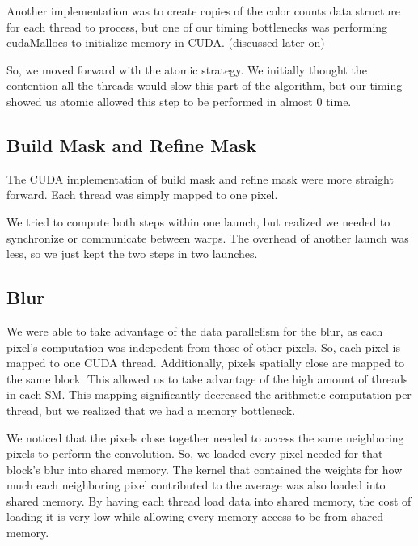 \documentclass[12pt]{article}
\begin{document}
Another implementation was to create copies of the color counts data structure
for each thread to process, but one of our timing bottlenecks was performing
cudaMallocs to initialize memory in CUDA. (discussed later on)

So, we moved forward with the atomic strategy. We initially thought the
contention all the threads would slow this part of the algorithm, but our
timing showed us atomic allowed this step to be performed in almost 0 time.

\subsection{Build Mask and Refine Mask}
The CUDA implementation of build mask and refine mask were more straight
forward. Each thread was simply mapped to one pixel.

We tried to compute both steps within one launch, but realized we needed to
synchronize or communicate between warps. The overhead of another launch was
less, so we just kept the two steps in two launches.

\subsection{Blur}
We were able to take advantage of the data parallelism for the blur, as each
pixel's computation was indepedent from those of other pixels. So, each pixel
is mapped to one CUDA thread. Additionally, pixels spatially close are mapped to
the same block. This allowed us to take advantage of the high
amount of threads in each SM. This mapping significantly decreased the
arithmetic computation per thread, but we realized that we had a memory
bottleneck.

We noticed that the pixels close together needed to access the same neighboring
pixels to perform the convolution. So, we loaded every pixel needed for that
block's blur into shared memory. The kernel that contained the weights for how
much each neighboring pixel contributed to the average was also loaded into
shared memory. By having each thread load data into shared
memory, the cost of loading it is very low while allowing every memory
access to be from shared memory.
\end{document}
